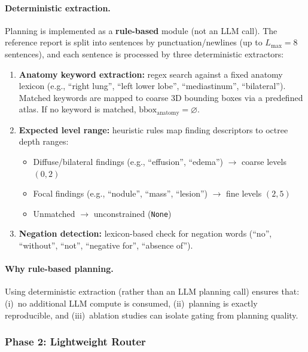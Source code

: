 \documentclass[11pt,a4paper]{article}
\begin{document}
\paragraph{Deterministic extraction.}
Planning is implemented as a \textbf{rule-based} module (not an LLM call).
The reference report is split into sentences by punctuation/newlines (up to $L_{\max}{=}8$ sentences), and each sentence is processed by three deterministic extractors:

\begin{enumerate}[nosep]
    \item \textbf{Anatomy keyword extraction:} regex search against a fixed anatomy lexicon (e.g., ``right lung'', ``left lower lobe'', ``mediastinum'', ``bilateral''). Matched keywords are mapped to coarse 3D bounding boxes via a predefined atlas. If no keyword is matched, $\mathrm{bbox}_{\mathrm{anatomy}} = \varnothing$.

    \item \textbf{Expected level range:} heuristic rules map finding descriptors to octree depth ranges:
    \begin{itemize}[nosep]
        \item Diffuse/bilateral findings (e.g., ``effusion'', ``edema'') $\to$ coarse levels $(0, 2)$
        \item Focal findings (e.g., ``nodule'', ``mass'', ``lesion'') $\to$ fine levels $(2, 5)$
        \item Unmatched $\to$ unconstrained (\texttt{None})
    \end{itemize}

    \item \textbf{Negation detection:} lexicon-based check for negation words (``no'', ``without'', ``not'', ``negative for'', ``absence of'').
\end{enumerate}

\paragraph{Why rule-based planning.}
Using deterministic extraction (rather than an LLM planning call) ensures that: (i)~no additional LLM compute is consumed, (ii)~planning is exactly reproducible, and (iii)~ablation studies can isolate gating from planning quality.

\subsubsection{Phase 2: Lightweight Router}
\label{sec:router}
\end{document}
